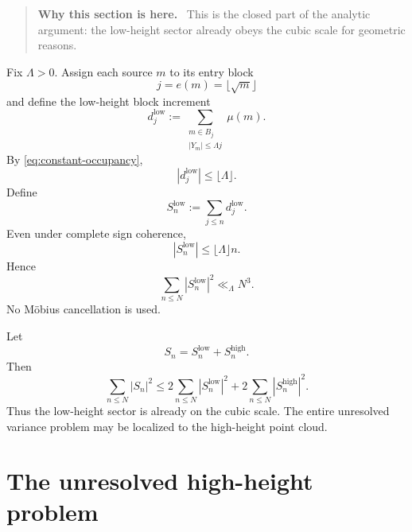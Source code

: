 \documentclass[11pt]{article}
\theoremstyle{definition}
\theoremstyle{remark}
\newcommand{\1}{\mathbf{1}}
\newenvironment{motivation}
  {\begin{quote}\small\color{ovvogray}\textbf{Why this section is here.}\ }
  {\end{quote}}
\begin{document}
\begin{motivation}
This is the closed part of the analytic argument: the low-height sector already obeys the cubic scale for geometric reasons.
\end{motivation}

Fix $\Lambda>0$.  Assign each source $m$ to its entry block
\begin{equation}
 j=e(m)=\lfloor\sqrt m\rfloor
 \label{eq:entry-block}
\end{equation}
and define the low-height block increment
\begin{equation}
 d_j^{\mathrm{low}}
 :=
 \sum_{\substack{m\in B_j\\|Y_m|\le\Lambda j}}
 \mu(m).
 \label{eq:low-block-increment}
\end{equation}
By \cref{eq:constant-occupancy},
\begin{equation}
 |d_j^{\mathrm{low}}|
 \le\lfloor\Lambda\rfloor.
 \label{eq:low-block-bound}
\end{equation}
Define
\begin{equation}
 S_n^{\mathrm{low}}
 :=\sum_{j\le n}d_j^{\mathrm{low}}.
 \label{eq:low-prefix}
\end{equation}
Even under complete sign coherence,
\begin{equation}
 |S_n^{\mathrm{low}}|
 \le\lfloor\Lambda\rfloor n.
 \label{eq:low-prefix-bound}
\end{equation}
Hence
\begin{equation}
 \boxed{
 \sum_{n\le N}|S_n^{\mathrm{low}}|^2
 \ll_{\Lambda}N^3.
 }
 \label{eq:low-cubic}
\end{equation}
No M\"obius cancellation is used.

Let
\begin{equation}
 S_n=S_n^{\mathrm{low}}+S_n^{\mathrm{high}}.
 \label{eq:low-high-split}
\end{equation}
Then
\begin{equation}
 \sum_{n\le N}|S_n|^2
 \le
 2\sum_{n\le N}|S_n^{\mathrm{low}}|^2
 +
 2\sum_{n\le N}|S_n^{\mathrm{high}}|^2.
 \label{eq:energy-low-high}
\end{equation}
Thus the low-height sector is already on the cubic scale.  The entire unresolved variance problem may be localized to the high-height point cloud.

\section{The unresolved high-height problem}
\label{sec:high-sector}
\end{document}
